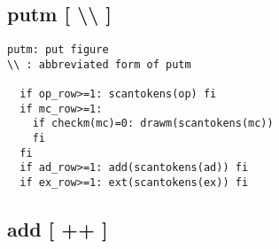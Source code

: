 \documentclass[a4paper]{article}
\begin{document}
\subsection{putm [ \textbackslash\textbackslash{ }]}
%
\index{\textbackslash\textbackslash}%
\begin{verbatim}
putm: put figure
\\ : abbreviated form of putm

  if op_row>=1: scantokens(op) fi
  if mc_row>=1:
    if checkm(mc)=0: drawm(scantokens(mc))
    fi
  fi
  if ad_row>=1: add(scantokens(ad)) fi
  if ex_row>=1: ext(scantokens(ex)) fi
\end{verbatim}
\newpage
\subsection{add [ ++ ]}
%
\index{++}%
%
%
%
%
%
%
%
%
%
%
%
%
%
\index{/*}%
\index{**}%
\index{\textgreater\textgreater}%
%
%
%
%
%
%
%
%
%
%
%
%
%
%
%
%
%
%
%
\end{document}
